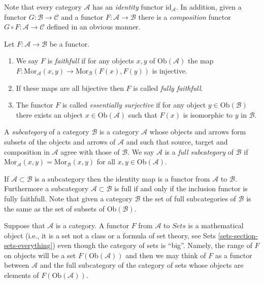 \noindent
Note that every category $\mathcal{A}$ has an
{\it identity} functor $\text{id}_\mathcal{A}$.
In addition, given a functor $G : \mathcal{B} \to \mathcal{C}$
and a functor $F : \mathcal{A} \to \mathcal{B}$ there is
a {\it composition} functor $G \circ F : \mathcal{A} \to \mathcal{C}$
defined in an obvious manner.

\begin{definition}
\label{definition-faithfull}
Let $F : \mathcal{A} \to \mathcal{B}$ be a functor.
\begin{enumerate}
\item We say $F$ is {\it faithfull} if 
for any objects $x,y$ of $\text{Ob}(\mathcal{A})$ the map
$F : \text{Mor}_\mathcal{A}(x,y) \to \text{Mor}_\mathcal{B}(F(x), F(y))$
is injective.
\item If these maps are all bijective then $F$ is called
{\it fully faithfull}.
\item
The functor $F$ is called {\it essentially surjective} if for any 
object $y \in \text{Ob}(\mathcal{B})$ there exists an object
$x \in \text{Ob}(\mathcal{A})$ such that $F(x)$ is isomorphic to $y$ in
$\mathcal{B}$.
\end{enumerate}
\end{definition}

\begin{definition}
\label{definition-subcategory}
A {\it subcategory} of a category $\mathcal{B}$ is
a category $\mathcal{A}$ whose objects and arrows
form subsets of the objects and arrows
of $\mathcal{A}$ and such that source, target
and composition in $\mathcal{A}$ agree with those
of $\mathcal{B}$. We say $\mathcal{A}$ is a
{\it full subcategory} of $\mathcal{B}$ if $\text{Mor}_{\mathcal{A}}(x,y)
= \text{Mor}_{\mathcal{B}}(x,y)$ for all $x,y \in \text{Ob}(\mathcal{A})$.
\end{definition}

\noindent
If $\mathcal{A} \subset \mathcal{B}$ is a subcategory then the
identity map is a functor from $\mathcal{A}$ to $\mathcal{B}$.
Furthermore a subcategory $\mathcal{A} \subset \mathcal{B}$
is full if and only if the inclusion functor is fully faithfull.
Note that given a category $\mathcal{B}$ the set of full subcategories
of $\mathcal{B}$ is the same as the set of subsets of
$\text{Ob}(\mathcal{B})$.

\begin{remark} 
\label{remark-functor-into-sets}
Suppose that $\mathcal{A}$ is a category.
A functor $F$ from $\mathcal{A}$ to $\textit{Sets}$
is a mathematical object (i.e., it is a set not a class or a formula
of set theory, see Sets \ref{sets-section-sets-everything})
even though the category of sets is ``big''.
Namely, the range of $F$ on objects will be 
a set $F(\text{Ob}(\mathcal{A}))$ and then we 
may think of $F$ as a functor between 
$\mathcal{A}$ and the full subcategory
of the category of sets whose
objects are elements of $F(\text{Ob}(\mathcal{A}))$.
\end{remark}

